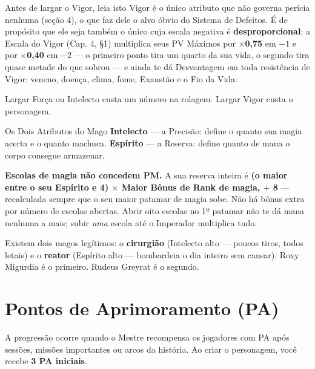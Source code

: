 \begin{aviso}{Antes de largar o Vigor, leia isto}
    Vigor é o único atributo que não governa perícia nenhuma (seção 4), o que faz dele o
    alvo óbvio do Sistema de Defeitos. É de propósito que ele seja também o único cuja
    escala negativa é \textbf{desproporcional}: a Escala do Vigor (Cap. 4, §1) multiplica
    seus PV Máximos por \textbf{$\times$0,75} em $-1$ e por \textbf{$\times$0,40} em $-2$
    --- o primeiro ponto tira um quarto da sua vida, o segundo tira quase metade do que
    sobrou --- e ainda te dá Desvantagem em toda resistência de Vigor: veneno, doença,
    clima, fome, Exaustão e o Fio da Vida.

    \medskip
    Largar Força ou Intelecto custa um número na rolagem. Largar Vigor custa o personagem.
\end{aviso}

\begin{nota}{Os Dois Atributos do Mago}
    \textbf{Intelecto} --- a Precisão: define o quanto sua magia acerta e o quanto machuca.
    \textbf{Espírito} --- a Reserva: define quanto de mana o corpo consegue armazenar.

    \medskip
    \textbf{Escolas de magia não concedem PM.} A sua reserva inteira é \textbf{(o maior
    entre o seu Espírito e 4) $\times$ Maior Bônus de Rank de magia, $+$ 8} --- recalculada
    sempre que o seu maior patamar de magia sobe. Não há bônus extra por número de escolas
    abertas. Abrir oito escolas no 1º patamar não te dá mana nenhuma a mais; subir
    \emph{uma} escola até o Imperador multiplica tudo.

    \medskip
    Existem dois magos legítimos: o \textbf{cirurgião} (Intelecto alto --- poucos tiros,
    todos letais) e o \textbf{reator} (Espírito alto --- bombardeia o dia inteiro sem
    cansar). Roxy Migurdia é o primeiro. Rudeus Greyrat é o segundo.
\end{nota}

\section{Pontos de Aprimoramento (PA)}

A progressão ocorre quando o Mestre recompensa os jogadores com PA após sessões, missões
importantes ou arcos da história. Ao criar o personagem, você recebe \textbf{3 PA
iniciais}.

